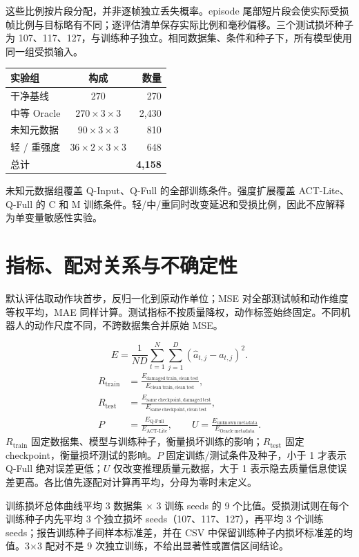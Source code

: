 \documentclass[11pt,a4paper,fontset=fandol]{ctexart}
\begin{document}
这些比例按片段分配，并非逐帧独立丢失概率。episode 尾部短片段会使实际受损帧比例与目标略有不同；逐评估清单保存实际比例和毫秒偏移。三个测试损坏种子为 107、117、127，与训练种子独立。相同数据集、条件和种子下，所有模型使用同一组受损输入。

\begin{center}
\small
\begin{tabular}{lcr}
\toprule
实验组 & 构成 & 数量 \\
\midrule
干净基线 & $270$ & 270 \\
中等 Oracle & $270\times3\times3$ & 2,430 \\
未知元数据 & $90\times3\times3$ & 810 \\
轻 / 重强度 & $36\times2\times3\times3$ & 648 \\
总计 &  & \textbf{4,158} \\
\bottomrule
\end{tabular}
\end{center}
未知元数据组覆盖 Q-Input、Q-Full 的全部训练条件。强度扩展覆盖 ACT-Lite、Q-Full 的 C 和 M 训练条件。轻/中/重同时改变延迟和受损比例，因此不应解释为单变量敏感性实验。
\clearpage\section{指标、配对关系与不确定性}
默认评估取动作块首步，反归一化到原动作单位；MSE 对全部测试帧和动作维度等权平均，MAE 同样计算。测试指标不按质量降权，动作标签始终固定。不同机器人的动作尺度不同，不跨数据集合并原始 MSE。

\[E=\frac{1}{ND}\sum_{t=1}^{N}\sum_{j=1}^{D}(\hat a_{t,j}-a_{t,j})^2.\]
\begin{align*}
R_{\mathrm{train}}&=\frac{E_{\mathrm{damaged\ train,clean\ test}}}{E_{\mathrm{clean\ train,clean\ test}}},\\
R_{\mathrm{test}}&=\frac{E_{\mathrm{same\ checkpoint,damaged\ test}}}{E_{\mathrm{same\ checkpoint,clean\ test}}},\\
P&=\frac{E_{\mathrm{Q\text{-}Full}}}{E_{\mathrm{ACT\text{-}Lite}}},\qquad
U=\frac{E_{\mathrm{unknown\ metadata}}}{E_{\mathrm{Oracle\ metadata}}}.
\end{align*}
$R_{\mathrm{train}}$ 固定数据集、模型与训练种子，衡量损坏训练的影响；$R_{\mathrm{test}}$ 固定 checkpoint，衡量损坏测试的影响。$P$ 固定训练/测试条件及种子，小于 1 才表示 Q-Full 绝对误差更低；$U$ 仅改变推理质量元数据，大于 1 表示隐去质量信息使误差更高。各比值先逐配对计算再平均，分母为零时未定义。

训练损坏总体曲线平均 3 数据集 × 3 训练 seeds 的 9 个比值。受损测试则在每个训练种子内先平均 3 个独立损坏 seeds（107、117、127），再平均 3 个训练 seeds；报告训练种子间样本标准差，并在 CSV 中保留训练种子内损坏标准差的均值。3×3 配对不是 9 次独立训练，不给出显著性或置信区间结论。
\end{document}
